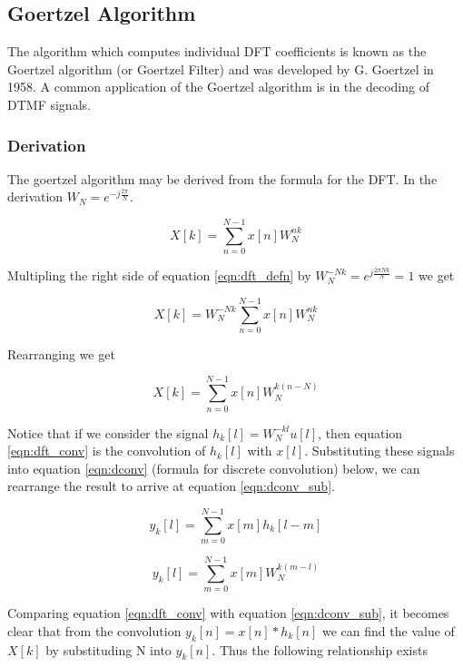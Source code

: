 \subsection{Goertzel Algorithm}

The algorithm which computes individual DFT coefficients is known as the Goertzel algorithm (or Goertzel Filter) and was developed by G. Goertzel in 1958. \cite{Goertzel1958} A common application of the Goertzel algorithm is in the decoding of DTMF\footnotemark{} signals.

\subsubsection{Derivation}
The goertzel algorithm may be derived from the formula for the DFT. In the derivation \(W_N = e^{-j\frac{2\pi}{N}}\).

\begin{equation}
	\label{eqn:dft_defn}
	X[k] = \sum_{n=0}^{N-1}x[n]W_{N}^{nk}
\end{equation}

Multipling the right side of equation \ref{eqn:dft_defn} by \(W_{N}^{-Nk} = e^{j\frac{2\pi N k}{N}} = 1\) we get

\begin{equation}
X[k] = W_{N}^{-Nk}\sum_{n=0}^{N-1}x[n]W_{N}^{nk}
\end{equation}

Rearranging we get

\begin{equation}
\label{eqn:dft_conv}
X[k] = \sum_{n=0}^{N-1}x[n]W_{N}^{k(n-N)}
\end{equation}

Notice that if we consider the signal \(h_k[l] = W_N^{-kl}u[l]\), then equation \ref{eqn:dft_conv} is the convolution of $h_k[l]$ with $x[l]$. Substituting these signals into equation \ref{eqn:dconv} (formula for discrete convolution) below, we can rearrange the result to arrive at equation \ref{eqn:dconv_sub}.

\begin{equation}
	\label{eqn:dconv}
	y_k[l] = \sum_{m=0}^{N-1}x[m]h_k[l - m]
\end{equation}

\begin{equation}
	\label{eqn:dconv_sub}
y_k[l] = \sum_{m=0}^{N-1}x[m]W_N^{k(m-l)}
\end{equation}

Comparing equation \ref{eqn:dft_conv} with equation \ref{eqn:dconv_sub}, it becomes clear that from the convolution $y_k[n] = x[n] * h_k[n]$ we can find the value of $X[k]$ by substituding N into $y_k[n]$. Thus the following relationship exists

